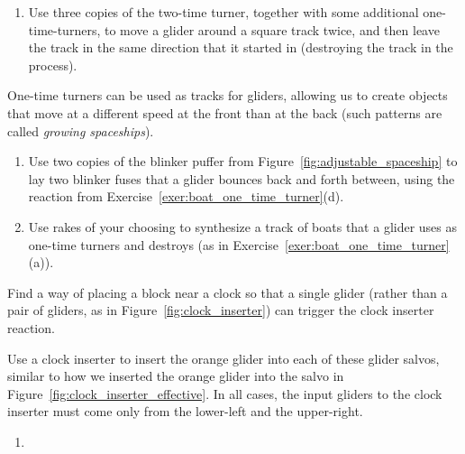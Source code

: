 \begin{multicols}{2}
\begin{problem}
\begin{enumerate}[label=(\alph*)]
		\item Use three copies of the two-time turner, together with some additional one-time-turners, to move a glider around a square track twice, and then leave the track in the same direction that it started in (destroying the track in the process).
	\end{enumerate}
\end{problem}

\mfilbreak

\begin{problem}\label{exer:one_time_track}
	One-time turners can be used as tracks for gliders, allowing us to create objects that move at a different speed at the front than at the back (such patterns are called \emph{growing spaceships}).
	\begin{enumerate}[label=(\alph*)]
		\item Use two copies of the blinker puffer from Figure~\ref{fig:adjustable_spaceship} to lay two blinker fuses that a glider bounces back and forth between, using the reaction from Exercise~\ref{exer:boat_one_time_turner}(d).
		
		\item Use rakes of your choosing to synthesize a track of boats that a glider uses as one-time turners and destroys (as in Exercise~\ref{exer:boat_one_time_turner}(a)).
	\end{enumerate}
\end{problem}

\mfilbreak

\begin{problem}\label{exer:clock_inserter_block}
	Find a way of placing a block near a clock so that a single glider (rather than a pair of gliders, as in Figure~\ref{fig:clock_inserter}) can trigger the clock inserter reaction.
\end{problem}

\mfilbreak

\begin{problem}\label{exer:clock_inserter_use}
	Use a clock inserter to insert the orange glider into each of these glider salvos, similar to how we inserted the orange glider into the salvo in Figure~\ref{fig:clock_inserter_effective}. In all cases, the input gliders to the clock inserter must come only from the lower-left and the upper-right.
	\vspace*{-0.3cm}\begin{multicols}{2}
		\begin{enumerate}[label=(\alph*)]
			\item {}
			

\end{enumerate}
\end{multicols}
\end{problem}
\end{multicols}
